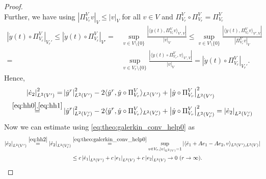 \documentclass[10pt,a4paper]{amsart}
\newcommand{\norm}[2]{\left|#1\right|_{#2}}
\begin{document}
\begin{proof}
\begin{equation}
    \end{equation}
    Further, we have using $\norm{\Pi^V_{V_r}v }{V}\leq \norm{v}{V}$ for all $v\in V$ and $\Pi_{V_r}^V\circ \Pi_{V_r}^V= \Pi_{V_r}^V $
    \begin{align}\nonumber
       \norm{\dot y(t)\circ  \Pi_{V_r}^V}{V_r'} \leq \norm{\dot y(t)\circ  \Pi_{V_r}^V}{V'}=& \sup_{ v\in V\setminus\{0\}}\tfrac{| \langle \dot y(t), \Pi_{V_r}^Vv\rangle_{V',V}|}{\norm{v}{V}}\leq\sup_{ v\in V\setminus\{0\}}\tfrac{| \langle \dot y(t), \Pi_{V_r}^Vv\rangle_{V',V}|}{\norm{ \Pi_{V_r}^Vv}{V}}\\
        =&\sup_{ v\in V_r\setminus\{0\}}\tfrac{| \langle \dot y(t)\circ  \Pi_{V_r}^V,v\rangle_{V',V}|}{\norm{v}{V}}= \norm{\dot y(t)\circ \Pi_{V_r}^V}{V_r'}.\label{eq:hh1}
    \end{align}
    Hence,
    \begin{align}\nonumber
        \norm{\dot e_2}{L^2(V')}^2 =& \norm{\dot y^r}{L^2(V')}^2-2\langle \dot y^r,  \dot y\circ  \Pi_{V_r}^V \rangle_{L^2(V')}+\norm{\dot y\circ  \Pi_{V_r}^V}{L^2(V')}^2\\
        \stackrel{\eqref{eq:hh0},\eqref{eq:hh1}}{=}&\norm{\dot y^r}{L^2(V_r')}^2-2\langle \dot y^r,  \dot y\circ  \Pi_{V_r}^V \rangle_{L^2(V_r')}+\norm{\dot y\circ \Pi_{V_r}^V}{L^2(V_r')}^2=\norm{\dot e_2}{L^2(V_r')}\label{eq:hh2}
    \end{align}
    Now we can estimate using \eqref{eq:theo:galerkin_conv_help0} as
    \begin{align*}
         \norm{\dot e_2}{L^2(V')}\stackrel{\eqref{eq:hh2}}{=} \norm{\dot e_2}{L^2(V_r')}
         &\stackrel{\eqref{eq:theo:galerkin_conv_help0}}{=}\sup_{v\in V_r, \norm{v}{L^2(V)}=1}|\langle \dot e_1+Ae_1-Ae_2,v \rangle_{L^2(V'),L^2(V)}|\\
         & \leq c \norm{\dot e_1}{L^2(V')}+ c\norm{e_1}{L^2(V)}+c\norm{e_2}{L^2(V)}\to 0 \ (r\to \infty).
    \end{align*}
\end{proof}
\end{document}

